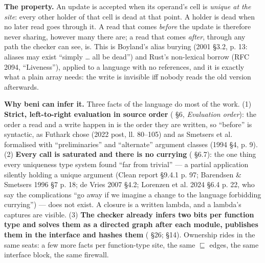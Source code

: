 
\textbf{The property.} An update is accepted when its operand's cell is \emph{unique at the site}: every other holder of that cell is dead at that point. A holder is dead when no later read goes through it. A read that comes \emph{before} the update is therefore never sharing, however many there are; a read that comes \emph{after}, through any path the checker can see, is. This is Boyland's alias burying (2001 §3.2, p. 13: aliases may exist “simply … all be dead”) and Rust's non-lexical borrow (RFC 2094, “Liveness”), applied to a language with no references, and it is exactly what a plain array needs: the write is invisible iff nobody reads the old version afterwards.

\textbf{Why beni can infer it.} Three facts of the language do most of the work. (1) \textbf{Strict, left-to-right evaluation in source order} ( §6, \emph{Evaluation order}): the order a read and a write happen in is the order they are written, so “before” is syntactic, as Futhark chose (2022 post, ll. 80–105) and as Smetsers et al. formalised with “preliminaries” and “alternate” argument classes (1994 §4, p. 9). (2) \textbf{Every call is saturated and there is no currying} ( §6.7): the one thing every uniqueness type system found “far from trivial” — a partial application silently holding a unique argument (Clean report §9.4.1 p. 97; Barendsen \& Smetsers 1996 §7 p. 18; de Vries 2007 §4.2; Lorenzen et al. 2024 §6.4 p. 22, who say the complications “go away if we imagine a change to the language forbidding currying”) — does not exist. A closure is a written lambda, and a lambda's captures are visible. (3) \textbf{The checker already infers two bits per function type and solves them as a directed graph after each module, publishes them in the interface and hashes them} ( §26;  §14). Ownership rides in the same seats: a few more facts per function-type site, the same $\sqsubseteq$ edges, the same interface block, the same firewall.

